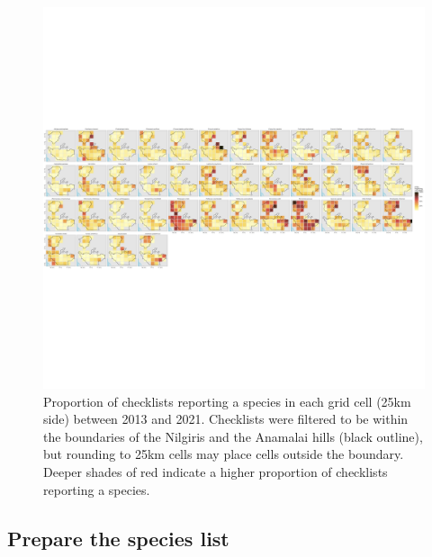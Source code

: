 \documentclass[
]{article}
\newenvironment{Shaded}{}{}
\newcommand{\CommentTok}[1]{\textcolor[rgb]{0.00,0.50,0.00}{#1}}
\newcommand{\DataTypeTok}[1]{#1}
\newcommand{\KeywordTok}[1]{\textcolor[rgb]{0.00,0.00,1.00}{#1}}
\newcommand{\NormalTok}[1]{#1}
\newcommand{\StringTok}[1]{\textcolor[rgb]{0.00,0.50,0.50}{#1}}
\begin{document}
\begin{figure}
\centering
\includegraphics{figs/fig_species_distributions.png}
\caption{Proportion of checklists reporting a species in each grid cell (25km side) between 2013 and 2021. Checklists were filtered to be within the boundaries of the Nilgiris and the Anamalai hills (black outline), but rounding to 25km cells may place cells outside the boundary. Deeper shades of red indicate a higher proportion of checklists reporting a species.}
\end{figure}

\hypertarget{prepare-the-species-list}{%
\subsection{Prepare the species list}\label{prepare-the-species-list}}

\begin{Shaded}
\end{Shaded}
\end{document}
